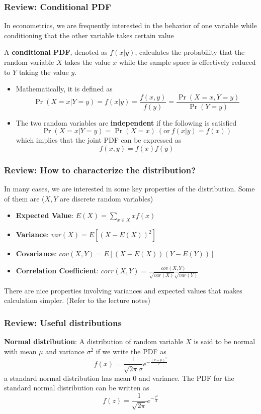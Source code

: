 \documentclass[aspectratio=169]{beamer}
\newenvironment{wideitemize}{\itemize\addtolength{\itemsep}{10pt}}{\enditemize}
\begin{document}
\begin{frame}
\frametitle{Review: Conditional PDF}
\begin{wideitemize}
\item In econometrics, we are frequently interested in the behavior of one variable while conditioning that the other variable takes certain value
\item  A \textbf{conditional PDF}, denoted as $f(x|y)$,  calculates the probability that the random variable $X$ takes the value $x$ while the sample space is effectively reduced to $Y$ taking the value $y$.
\begin{itemize}
\item Mathematically, it is defined as
\[
\Pr(X=x|Y=y)=f(x|y)=\frac{f(x,y)}{f(y)}=\frac{\Pr(X=x, Y=y)}{\Pr(Y=y)}
\] 
\item The two random variables are \textbf{independent} if the following is satisfied
\[
\Pr(X=x|Y=y)=\Pr(X=x)\ (\text{or}\ f(x|y)=f(x))
\]
which implies that the joint PDF can be expressed as
\[
f(x,y)=f(x)f(y)
\]
\end{itemize}
\end{wideitemize}
\end{frame}


\begin{frame}
\frametitle{Review: How to characterize the distribution?}
\begin{wideitemize}
\item In many cases, we are interested in some key properties of the distribution. Some of them are ($X,Y$ are discrete random variables) \\
\begin{itemize}
\item \textbf{Expected Value}: $E(X)=\sum_{x\in X} xf(x)$
\item \textbf{Variance}: $var(X)=E[(X-E(X))^2]$
\item \textbf{Covariance}: $cov(X,Y)=E[(X-E(X))(Y-E(Y))]$
\item \textbf{Correlation Coefficient}: $corr(X,Y)=\frac{cov(X,Y)}{\sqrt{var(X)}\sqrt{var(Y)}}$
\end{itemize}
\item There are nice properties involving variances and expected values that makes calculation simpler. (Refer to the lecture notes)
\end{wideitemize}
\end{frame}


\begin{frame}
\frametitle{Review: Useful distributions}
\begin{wideitemize}
\item \textbf{Normal distribution}: A distribution of random variable $X$ is said to be normal with mean $\mu$ and variance $\sigma^2$ if we write the PDF as
\[
f(x) = \frac{1}{\sqrt{2\pi}\sigma}e^{-\frac{(x-\mu)^2}{2}}
\]
a standard normal distribution has mean 0 and variance. The PDF for the standard normal distribution can be written as 
\[
f(z) = \frac{1}{\sqrt{2\pi}}e^{-\frac{z^2}{2}}
\]\end{wideitemize}
\end{frame}
\end{document}
